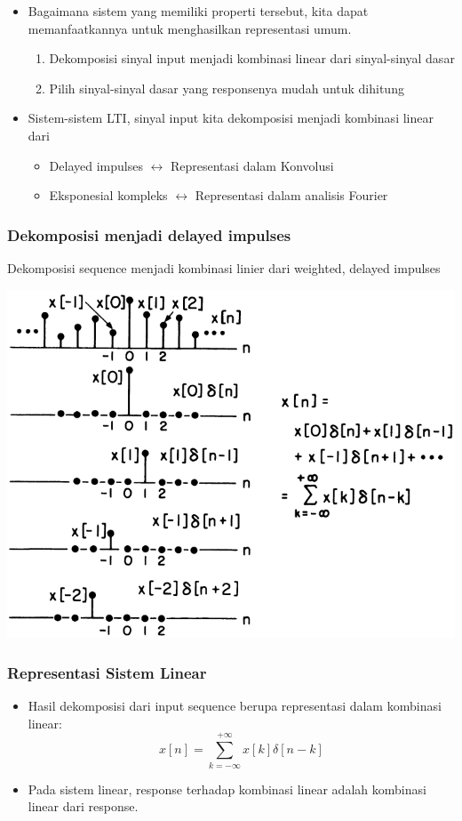 \documentclass[pdflatex,compress,mathserif]{beamer}
\begin{document}
\begin{frame}
	\begin{itemize}
		\item Bagaimana sistem yang memiliki properti tersebut, kita dapat memanfaatkannya untuk menghasilkan representasi umum. 
		\begin{enumerate}
			\item Dekomposisi sinyal input menjadi kombinasi linear dari sinyal-sinyal dasar
			\item Pilih sinyal-sinyal dasar yang responsenya mudah untuk dihitung
		\end{enumerate}
		\item Sistem-sistem LTI, sinyal input kita dekomposisi menjadi kombinasi linear dari
		\begin{itemize}
			\item Delayed impulses $\leftrightarrow$ Representasi dalam Konvolusi
			\item Eksponesial kompleks $\leftrightarrow$ Representasi dalam analisis Fourier
		\end{itemize}
	\end{itemize}
\end{frame}

\begin{frame}
	\frametitle{Dekomposisi menjadi delayed impulses}
	Dekomposisi sequence menjadi kombinasi linier dari weighted, delayed impulses
	\begin{center}
		\includegraphics[width=0.7\linewidth]{img/img01}
	\end{center}
\end{frame}

\begin{frame}
	\frametitle{Representasi Sistem Linear}
	\begin{itemize}
		\item Hasil dekomposisi dari input sequence berupa representasi dalam kombinasi linear:
		\begin{equation*}
		x[n] = \sum\limits_{k = -\infty}^{+\infty} x[k]\delta[n-k]
		\end{equation*}
		\item Pada sistem linear, response terhadap kombinasi linear adalah kombinasi linear dari response.
	\end{itemize}
\end{frame}
\end{document}
